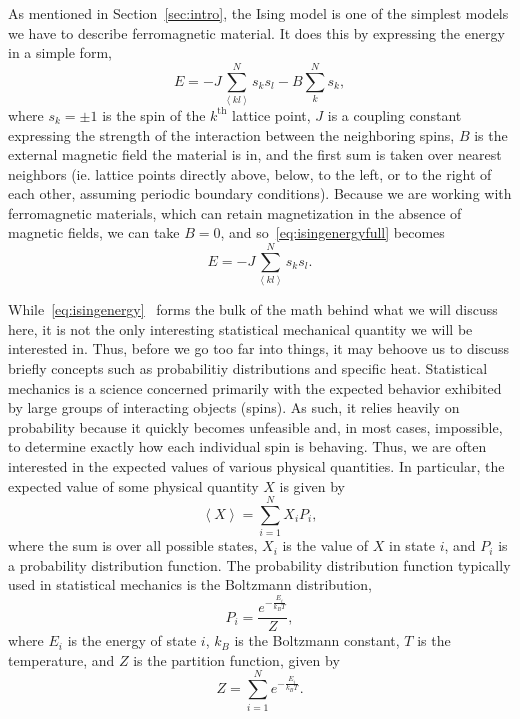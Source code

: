 \documentclass[12pt]{article}
\numberwithin{equation}{section}
\begin{document}
As mentioned in Section~\ref{sec:intro}, the Ising model is one of the simplest models we have to describe ferromagnetic material.  It does this by expressing the energy in a simple form,
\begin{equation}
\label{eq:isingenergyfull}
E = -J\sum_{\left<kl\right>}^{N}s_{k}s_{l}-B\sum_{k}^{N}s_{k},
\end{equation}
where $s_{k}=\pm1$ is the spin of the $k^{\text{th}}$ lattice point, $J$ is a coupling constant expressing the strength of the interaction between the neighboring spins, $B$ is the external magnetic field the material is in, and the first sum is taken over nearest neighbors (ie. lattice points directly above, below, to the left, or to the right of each other, assuming periodic boundary conditions).  Because we are working with ferromagnetic materials, which can retain magnetization in the absence of magnetic fields, we can take $B=0$, and so~\eqref{eq:isingenergyfull} becomes
\begin{equation}
\label{eq:isingenergy}
E = -J\sum_{\left<kl\right>}^{N}s_{k}s_{l}.
\end{equation}
\par While~\eqref{eq:isingenergy}~\cite{lecture} forms the bulk of the math behind what we will discuss here, it is not the only interesting statistical mechanical quantity we will be interested in.  Thus, before we go too far into things, it may behoove us to discuss briefly concepts such as probabilitiy distributions and specific heat.  Statistical mechanics is a science concerned primarily with the expected behavior exhibited by large groups of interacting objects (spins).  As such, it relies heavily on probability because it quickly becomes unfeasible and, in most cases, impossible, to determine exactly how each individual spin is behaving.  Thus, we are often interested in the expected values of various physical quantities.  In particular, the expected value of some physical quantity $X$ is given by 
\begin{equation}
\label{eq:expvaldef}
\left<X\right>=\sum_{i=1}^{N}X_{i}P_{i},
\end{equation}
where the sum is over all possible states, $X_{i}$ is the value of $X$ in state $i$, and $P_{i}$ is a probability distribution function.  The probability distribution function typically used in statistical mechanics is the Boltzmann distribution, 
\begin{equation}
\label{eq:boltzmann}
P_{i} = \frac{e^{-\frac{E_{i}}{k_{B}T}}}{Z},
\end{equation}
where $E_{i}$ is the energy of state $i$, $k_{B}$ is the Boltzmann constant, $T$ is the temperature, and $Z$ is the partition function, given by
\begin{equation}
\label{eq:partition}
Z=\sum_{i=1}^{N}e^{-\frac{E_{i}}{k_{B}T}}.
\end{equation}
\end{document}
